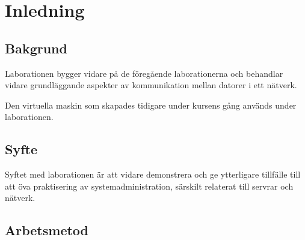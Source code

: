 %
%
%


\section{Inledning}


\subsection{Bakgrund}
Laborationen bygger vidare på de föregående laborationerna och behandlar vidare
grundläggande aspekter av kommunikation mellan datorer i ett nätverk.

Den virtuella maskin som skapades tidigare under kursens gång används under
laborationen.

\subsection{Syfte}
Syftet med laborationen är att vidare demonstrera och ge ytterligare tillfälle
till att öva praktisering av systemadministration, särskilt relaterat till
servrar och nätverk.

\subsection{Arbetsmetod}

